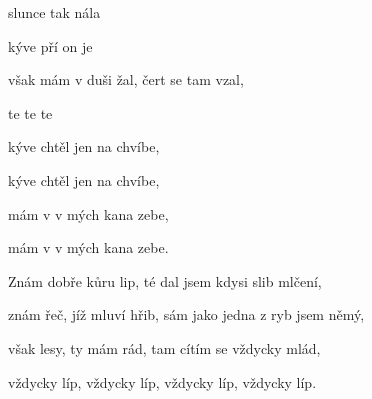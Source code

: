 

\zs
{} slunce  tak  nála     

 kýve  pří on je      

 však mám v duši žal, čert  se tam vzal,

te te te 
\ks

\zr
{} kýve  chtěl  jen na chvíbe,

 kýve  chtěl  jen na chvíbe,

 mám v  v mých  kana zebe,

 mám v  v mých  kana zebe.
\kr

\zs
Znám dobře kůru lip, té dal jsem kdysi slib mlčení,

znám řeč, jíž mluví hřib, sám jako jedna z ryb jsem němý,

však lesy, ty mám rád, tam cítím se vždycky mlád,

vždycky líp, vždycky líp, vždycky líp, vždycky líp.
\ks

\zr
\kr

\kp



